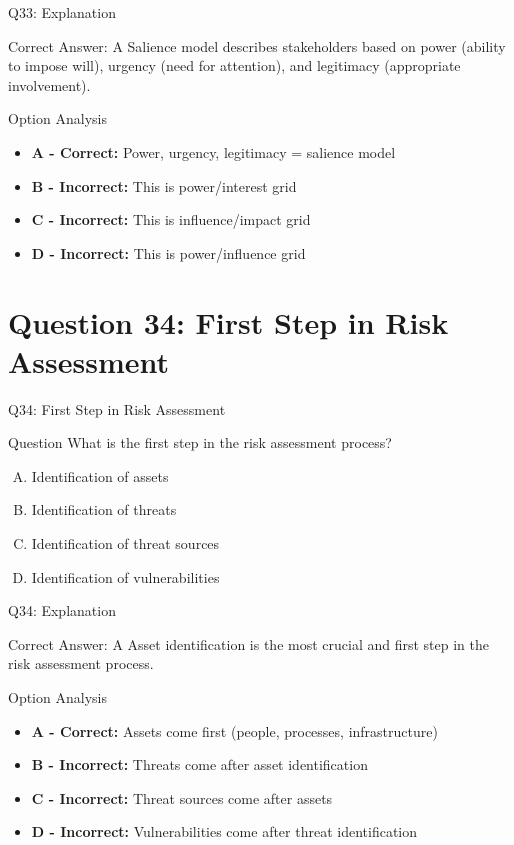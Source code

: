 \documentclass{beamer}
\begin{document}
	\begin{frame}{Q33: Explanation}
		\begin{block}{Correct Answer: A}
			Salience model describes stakeholders based on power (ability to impose will), urgency (need for attention), and legitimacy (appropriate involvement).
		\end{block}
		\begin{block}{Option Analysis}
			\begin{itemize}
				\item \textbf{A - Correct:} Power, urgency, legitimacy = salience model
				\item \textbf{B - Incorrect:} This is power/interest grid
				\item \textbf{C - Incorrect:} This is influence/impact grid
				\item \textbf{D - Incorrect:} This is power/influence grid
			\end{itemize}
		\end{block}
	\end{frame}
	
	\section{Question 34: First Step in Risk Assessment}
	
	\begin{frame}{Q34: First Step in Risk Assessment}
		\begin{block}{Question}
			What is the first step in the risk assessment process?
		\end{block}
		\begin{enumerate}[(A)]
			\item Identification of assets
			\item Identification of threats
			\item Identification of threat sources
			\item Identification of vulnerabilities
		\end{enumerate}
	\end{frame}
	
	\begin{frame}{Q34: Explanation}
		\begin{block}{Correct Answer: A}
			Asset identification is the most crucial and first step in the risk assessment process.
		\end{block}
		\begin{block}{Option Analysis}
			\begin{itemize}
				\item \textbf{A - Correct:} Assets come first (people, processes, infrastructure)
				\item \textbf{B - Incorrect:} Threats come after asset identification
				\item \textbf{C - Incorrect:} Threat sources come after assets
				\item \textbf{D - Incorrect:} Vulnerabilities come after threat identification
			\end{itemize}
		\end{block}
	\end{frame}
	
\end{document}
